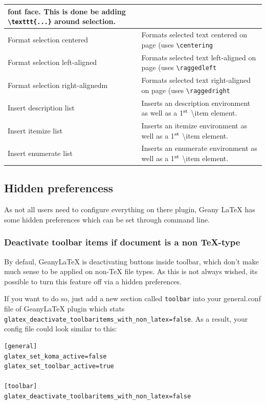 \documentclass[%
paper=a4,%
fontsize=11pt,%
twoside=false,%
DIV18,
headsepline,
plainheadsepline,
footsepline,
plainfootsepline,
bibliography=totoc,%
listof=totoc,%
BCOR10mm,%
parskip=half,%
openany,%
]{scrartcl}
\newcommand{\up}[1]{\ensuremath{^\textrm{\scriptsize#1}}}
\begin{document}
\begin{table}[H]
\begin{tabular}{l|p{9cm}}
font face. This is done be adding \texttt{\textbackslash texttt\{...\}} around
selection.\\\hline
Format selection centered & Formats selected text centered on page (uses \texttt{\textbackslash{}centering} \\\hline
Format selection left-aligned & Formats selected text left-aligned on page (uses \texttt{\textbackslash{}raggedleft} \\\hline
Format selection right-alignedm & Formats selected text right-aligned on page (uses \texttt{\textbackslash{}raggedright}\\\hline
Insert description list & Inserts an description environment as well as a 1\up{st} \textbackslash{}item element.\\\hline
Insert itemize list & Inserts an itemize environment as well as a 1\up{st} \textbackslash{}item element.\\\hline
Insert enumerate list & Inserts an enumerate environment as well as a 1\up{st} \textbackslash{}item element.\\\hline
\end{tabular}
\end{table}


\subsection{Hidden preferencess}
As not all users need to configure everything on there plugin, Geany
\LaTeX{} has some hidden preferences which can be set through
command line.

\subsubsection{Deactivate toolbar items if document is a non \TeX-type}

By defaul, Geany\LaTeX{} is deactivating buttons inside toolbar, which
don't make much sense to be applied on non-\TeX{} file types. As
this is not always wished, its possible to turn this feature off
via a hidden preferences.

If you want to do so, just add a new section called \texttt{toolbar}
into your general.conf file of Geany\LaTeX{} plugin which stats
\texttt{glatex\_deactivate\_toolbaritems\_with\_non\_latex=false}.
As a result, your config file could look similar to this:

\begin{lstlisting}
[general]
glatex_set_koma_active=false
glatex_set_toolbar_active=true

[toolbar]
glatex_deactivate_toolbaritems_with_non_latex=false
\end{lstlisting}
\end{document}

